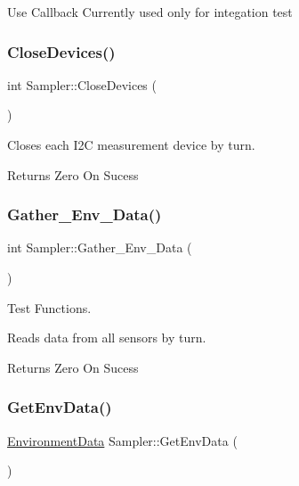 Use Callback Currently used only for integation test \mbox{\label{classSampler_a24077f1eeb2491b65f9577efd07dffd6}} 
\subsubsection{\texorpdfstring{Close\+Devices()}{CloseDevices()}}
{\footnotesize\ttfamily int Sampler\+::\+Close\+Devices (\begin{DoxyParamCaption}{ }\end{DoxyParamCaption})\hspace{0.3cm}{\ttfamily [private]}}

Closes each I2C measurement device by turn.

\begin{DoxyReturn}{Returns}
Zero On Sucess 
\end{DoxyReturn}
\mbox{\label{classSampler_a5702d0ef89adb532fef4f9879e7e36d4}} 
\subsubsection{\texorpdfstring{Gather\+\_\+\+Env\+\_\+\+Data()}{Gather\_Env\_Data()}}
{\footnotesize\ttfamily int Sampler\+::\+Gather\+\_\+\+Env\+\_\+\+Data (\begin{DoxyParamCaption}{ }\end{DoxyParamCaption})}



Test Functions. 

Reads data from all sensors by turn.

\begin{DoxyReturn}{Returns}
Zero On Sucess 
\end{DoxyReturn}
\mbox{\label{classSampler_a22edd729c6bbb5582ebac7681041cf55}} 
\subsubsection{\texorpdfstring{Get\+Env\+Data()}{GetEnvData()}}
{\footnotesize\ttfamily \hyperlink{structEnvironmentData}{Environment\+Data} Sampler\+::\+Get\+Env\+Data (\begin{DoxyParamCaption}{ }\end{DoxyParamCaption})}


